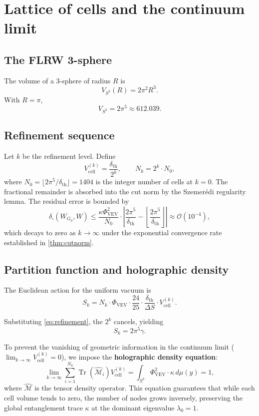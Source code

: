 \documentclass[12pt]{article}
\numberwithin{equation}{section}
\newcommand{\VEV}{\Phi_{\mathrm{VEV}}}
\newcommand{\dth}{\delta_{\mathrm{th}}}
\newcommand{\DS}{\Delta S}
\newcommand{\SphereR}{R}
\begin{document}
\section{Lattice of cells and the continuum limit}
\subsection{The FLRW 3-sphere}

The volume of a 3-sphere of radius \(\SphereR\) is
\[
V_{S^3}(\SphereR) = 2\pi^2 \SphereR^3. \tag{24}
\]
With \(\SphereR = \pi\),
\[
V_{S^3} = 2\pi^5 \approx 612.039. \tag{25}
\]

\subsection{Refinement sequence}

Let \(k\) be the refinement level. Define
\begin{equation}\label{eq:refinement}
V_{\text{cell}}^{(k)} = \frac{\dth}{2^k}, \qquad N_k = 2^k \cdot N_0,
\end{equation}
where \(N_0 = \lfloor 2\pi^5 / \dth \rfloor = 1404\) is the integer number of cells at \(k=0\). The fractional remainder is absorbed into the cut norm by the Szemerédi regularity lemma. The residual error is bounded by
\[
\delta_{\square}(W_{G_0}, W) \le \frac{\kappa \VEV^2}{N_0} \cdot \left| \frac{2\pi^5}{\dth} - \left\lfloor \frac{2\pi^5}{\dth} \right\rfloor \right| \approx \mathcal{O}(10^{-4}), \tag{27}
\]
which decays to zero as \(k \to \infty\) under the exponential convergence rate established in \cref{thm:cutnorm}.

\subsection{Partition function and holographic density}

The Euclidean action for the uniform vacuum is
\[
S_k = N_k \cdot \VEV \cdot \frac{24}{25} \cdot \frac{\dth}{\DS} \cdot V_{\text{cell}}^{(k)}. \tag{28}
\]

Substituting \eqref{eq:refinement}, the \(2^k\) cancels, yielding
\[
S_k = 2\pi^5 \gamma. \tag{29}
\]

To prevent the vanishing of geometric information in the continuum limit (\(\lim_{k \to \infty} V_{\text{cell}}^{(k)} = 0\)), we impose the \textbf{holographic density equation}:
\[
\lim_{k \to \infty} \sum_{i=1}^{N_k} \operatorname{Tr}\left( \widehat{\mathcal{M}}_i \right) V_{\text{cell}}^{(k)} = \int_{S^3} \VEV^2 \cdot \kappa \, d\mu(y) = 1, \tag{30}
\]
where \(\widehat{\mathcal{M}}\) is the tensor density operator. This equation guarantees that while each cell volume tends to zero, the number of nodes grows inversely, preserving the global entanglement trace \(\kappa\) at the dominant eigenvalue \(\lambda_0 = 1\).
\end{document}
